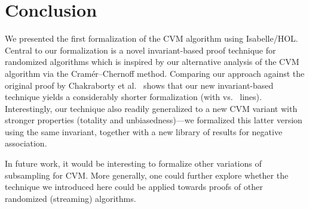 \section{Conclusion}\label{sec:conclusion}
We presented the first formalization of the CVM algorithm using Isabelle/HOL.
Central to our formalization is a novel invariant-based proof technique for randomized algorithms which is inspired by our alternative analysis of the CVM algorithm via the Cram\'{e}r--Chernoff method.
Comparing our approach against the original proof by Chakraborty et al.~\cite{chakraborty2023} shows that our new invariant-based technique yields a considerably shorter formalization (with \locnew vs. \locold~lines).
Interestingly, our technique also readily generalized to a new CVM variant with stronger properties (totality and unbiasedness)---we formalized this latter version using the same invariant, together with a new library of results for negative association.

In future work, it would be interesting to formalize other variations of subsampling for CVM.
More generally, one could further explore whether the technique we introduced here could be applied towards proofs of other randomized (streaming) algorithms.
